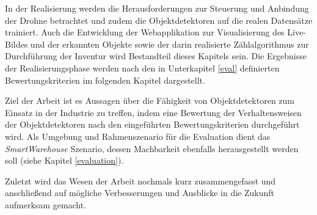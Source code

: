 In der Realisierung werden die Herausforderungen zur Steuerung und Anbindung der Drohne betrachtet und zudem die Objektdetektoren auf die realen Datensätze trainiert. Auch die Entwicklung der Webapplikation zur Visualisierung des Live-Bildes und der erkannten Objekte sowie der darin realisierte Zählalgorithmus zur Durchführung der Inventur wird Bestandteil dieses Kapitels sein. Die Ergebnisse der Realisierungsphase werden nach den in Unterkapitel \ref{eval} definierten Bewertungskriterien im folgenden Kapitel dargestellt. 

Ziel der Arbeit ist es Aussagen über die Fähigkeit von Objektdetektoren zum Einsatz in der Industrie zu treffen, indem eine Bewertung der Verhaltensweisen der Objektdetektoren nach den eingeführten Bewertungskriterien durchgeführt wird. Als Umgebung und Rahmenszenario für die Evaluation dient das \textit{SmartWarehouse} Szenario, dessen Machbarkeit ebenfalls herausgestellt werden soll (siehe Kapitel \ref{evaluation}).

Zuletzt wird das Wesen der Arbeit nochmals kurz zusammengefasst und anschließend auf mögliche Verbesserungen und Ausblicke in die Zukunft aufmerksam gemacht. 
